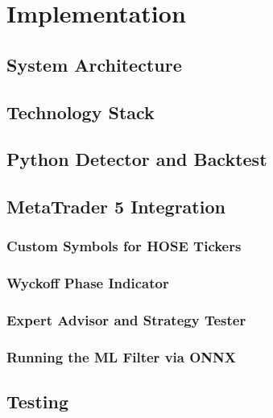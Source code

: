 \chapter{Implementation}
\label{ch:implementation}

\section{System Architecture}

\section{Technology Stack}

\section{Python Detector and Backtest}

\section{MetaTrader 5 Integration}
\subsection{Custom Symbols for HOSE Tickers}
\subsection{Wyckoff Phase Indicator}
\subsection{Expert Advisor and Strategy Tester}
\subsection{Running the ML Filter via ONNX}

\section{Testing}
